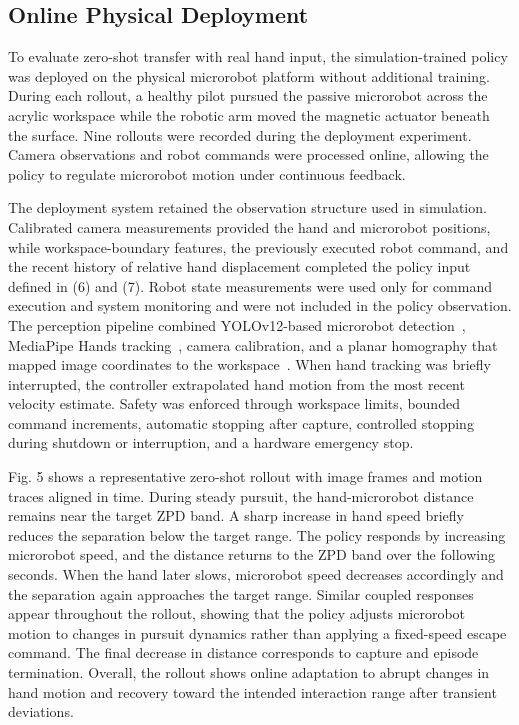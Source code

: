 \documentclass[journal,twoside,web]{ieeecolor2}
\begin{document}
\subsection{Online Physical Deployment}
To evaluate zero-shot transfer with real hand input, the simulation-trained policy was deployed on the physical microrobot platform without additional training. During each rollout, a healthy pilot pursued the passive microrobot across the acrylic workspace while the robotic arm moved the magnetic actuator beneath the surface. Nine rollouts were recorded during the deployment experiment. Camera observations and robot commands were processed online, allowing the policy to regulate microrobot motion under continuous feedback.

The deployment system retained the observation structure used in simulation. Calibrated camera measurements provided the hand and microrobot positions, while workspace-boundary features, the previously executed robot command, and the recent history of relative hand displacement completed the policy input defined in (6) and (7). Robot state measurements were used only for command execution and system monitoring and were not included in the policy observation. The perception pipeline combined YOLOv12-based microrobot detection~\cite{b48,b49}, MediaPipe Hands tracking~\cite{b50}, camera calibration, and a planar homography that mapped image coordinates to the workspace~\cite{b51}. When hand tracking was briefly interrupted, the controller extrapolated hand motion from the most recent velocity estimate. Safety was enforced through workspace limits, bounded command increments, automatic stopping after capture, controlled stopping during shutdown or interruption, and a hardware emergency stop.

Fig. 5 shows a representative zero-shot rollout with image frames and motion traces aligned in time. During steady pursuit, the hand-microrobot distance remains near the target ZPD band. A sharp increase in hand speed briefly reduces the separation below the target range. The policy responds by increasing microrobot speed, and the distance returns to the ZPD band over the following seconds. When the hand later slows, microrobot speed decreases accordingly and the separation again approaches the target range. Similar coupled responses appear throughout the rollout, showing that the policy adjusts microrobot motion to changes in pursuit dynamics rather than applying a fixed-speed escape command. The final decrease in distance corresponds to capture and episode termination. Overall, the rollout shows online adaptation to abrupt changes in hand motion and recovery toward the intended interaction range after transient deviations.
\end{document}
